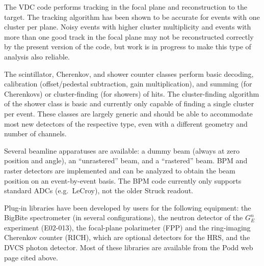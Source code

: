 {{The VDC code performs tracking in the focal plane and reconstruction to the
target. The tracking algorithm has been shown to be accurate for events 
with one cluster per plane. Noisy events with higher cluster multiplicity
and events with more than one good track in the focal plane may not be
reconstructed correctly by the present version of the code, but work is in
progress to make this type of analysis also reliable.

The scintillator, Cherenkov, and shower counter classes perform basic decoding,
calibration (offset/pedestal subtraction, gain multiplication), and summing 
(for Cherenkovs) or cluster-finding (for showers) of hits. 
The cluster-finding algorithm of the shower class is basic and currently 
only capable of finding a single cluster per event. These classes are largely
generic and should be able to accommodate most new detectors of the respective 
type, even with a different geometry and number of channels.

Several beamline apparatuses are available: a dummy beam (always at zero 
position and angle), an ``unrastered'' beam, and a ``rastered'' beam. 
BPM and raster detectors are implemented and 
can be analyzed to obtain the beam position
on an event-by-event basis.  The BPM code currently only supports
standard ADCs (e.g.\ LeCroy), not the older Struck readout.

Plug-in libraries have been developed by users for the following equipment:
the BigBite spectrometer (in several configurations), 
the neutron detector of the $G_E^n$ experiment (E02-013),
the focal-plane polarimeter (FPP) and the ring-imaging Cherenkov counter
(RICH), which are optional detectors for the HRS, and the DVCS photon
detector. Most of these libraries are available from the Podd web page
cited above.

}}
